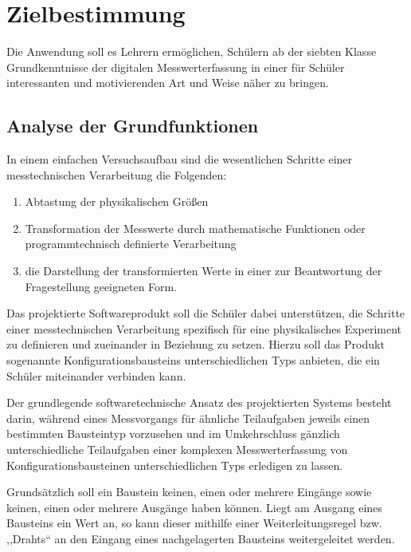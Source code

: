 \documentclass[parskip=full]{scrartcl}
\begin{document}
\clearpage
\section{Zielbestimmung}\label{zielbestimmung}



Die Anwendung soll es Lehrern ermöglichen, Schülern ab der siebten Klasse Grundkenntnisse der digitalen Messwerterfassung in einer für Schüler interessanten und motivierenden Art und Weise näher zu bringen. 

\subsection{Analyse der Grundfunktionen}

In einem einfachen Versuchsaufbau sind die wesentlichen Schritte einer messtechnischen Verarbeitung die Folgenden: 

\begin{enumerate}
	\item Abtastung der physikalischen Größen
	
	\item Transformation der Messwerte durch mathematische Funktionen oder programmtechnisch definierte Verarbeitung
	
	\item die Darstellung der transformierten Werte in einer zur Beantwortung der Fragestellung geeigneten Form.
	
\end{enumerate}

Das projektierte Softwareprodukt soll die Schüler dabei unterstützen, die Schritte einer messtechnischen Verarbeitung spezifisch für eine physikalisches Experiment zu definieren und zueinander in Beziehung zu setzen. Hierzu soll das Produkt sogenannte \glspl{Konfigurationsbaustein} unterschiedlichen Typs anbieten, die ein Schüler miteinander verbinden kann. 

 Der grundlegende softwaretechnische Ansatz des projektierten Systems besteht darin, während eines Messvorgangs für ähnliche Teilaufgaben jeweils einen bestimmten Bausteintyp vorzusehen und im Umkehrschluss gänzlich unterschiedliche Teilaufgaben einer komplexen Messwerterfassung von Konfigurationsbausteinen unterschiedlichen Typs erledigen zu lassen.
 
Grundsätzlich soll ein Baustein keinen, einen oder mehrere Eingänge sowie keinen, einen oder mehrere Ausgänge haben können.  Liegt am Ausgang eines Bausteins ein Wert an, so kann dieser mithilfe einer Weiterleitungsregel bzw. ,,Drahts`` an den Eingang eines nachgelagerten Bausteins weitergeleitet werden.
\end{document}
